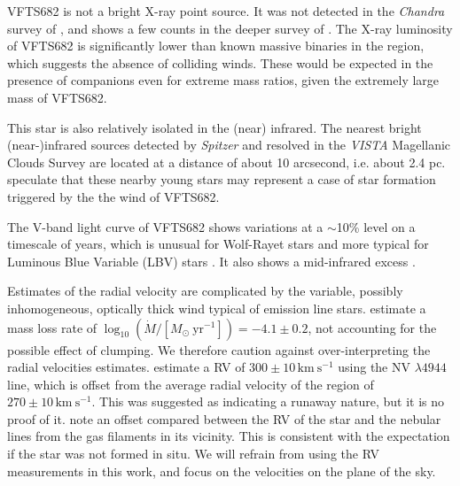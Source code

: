 \documentclass[a4paper,fleqn,usenatbib]{mnras}
\newcommand{\kms}{{\,\mathrm{km\ s^{-1}}}}
\begin{document}
VFTS682 is not a bright X-ray point source. It was not detected in the
\emph{Chandra} survey of \cite{townsley:06}, and shows a few counts in
the deeper survey of \cite{townsley:14}.
The X-ray luminosity of VFTS682
is significantly lower than known massive binaries in the region, which suggests the absence of
colliding winds. These would be expected in the presence of companions
even for extreme mass ratios, given the extremely large mass of
VFTS682.

This star is also relatively isolated in the (near)
infrared. The nearest bright (near-)infrared sources detected by
\emph{Spitzer} \citep{meixner:06} and resolved in the \emph{VISTA}
Magellanic Clouds Survey \citep{cioni:11} are located at a distance of
about 10 arcsecond, i.e. about 2.4 pc. \cite{walborn:13} speculate
that these nearby young stars may represent a case of star formation triggered by the the wind of VFTS682.

The V-band light curve of VFTS682  shows
variations at a $\sim$10\% level on a timescale of years, which is
unusual for Wolf-Rayet stars and more typical for Luminous Blue
Variable (LBV) stars \citep{udalski:08, bestenlehner:11}. It also
shows a mid-infrared excess \citep{gruendl:09}.

Estimates of the radial velocity are complicated by the variable,
possibly inhomogeneous, optically thick wind  typical of emission line
stars. \citet{bestenlehner:11} estimate a mass loss rate of
$\log_{10}(\dot{M}/[M_\odot \ \mathrm{yr}^{-1}])=-4.1\pm0.2$, not accounting for the
possible effect of clumping.  We therefore caution
against over-interpreting the radial velocities estimates. %
\citet{bestenlehner:11}  estimate a RV of
$300\pm10\kms$ using the  N{\footnotesize V} $\lambda4944$ line, which
is offset from the average radial velocity of the region of
$270\pm10\kms$. This was suggested as indicating a runaway nature, but
it is no proof of it. %
\cite{bressert:12} note an offset compared between the RV of
the star and the nebular lines from the gas filaments in its
vicinity. This is consistent with the expectation if the star was not
formed in situ. We will refrain from using the RV measurements in this
work, and focus on the velocities on the plane of the sky. 
\end{document}
